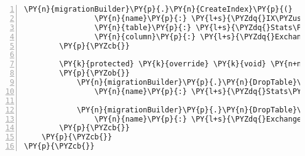 \begin{Verbatim}[commandchars=\\\{\},numbers=left,firstnumber=1,stepnumber=1,numberblanklines=0]
            \PY{n}{migrationBuilder}\PY{p}{.}\PY{n}{CreateIndex}\PY{p}{(}
                \PY{n}{name}\PY{p}{:} \PY{l+s}{\PYZdq{}IX\PYZus{}Stats\PYZus{}ExchangeId\PYZdq{}}\PY{p}{,}
                \PY{n}{table}\PY{p}{:} \PY{l+s}{\PYZdq{}Stats\PYZdq{}}\PY{p}{,}
                \PY{n}{column}\PY{p}{:} \PY{l+s}{\PYZdq{}ExchangeId\PYZdq{}}\PY{p}{)}\PY{p}{;}
        \PY{p}{\PYZcb{}}

        \PY{k}{protected} \PY{k}{override} \PY{k}{void} \PY{n+nf}{Down}\PY{p}{(}\PY{n}{MigrationBuilder} \PY{n}{migrationBuilder}\PY{p}{)}
        \PY{p}{\PYZob{}}
            \PY{n}{migrationBuilder}\PY{p}{.}\PY{n}{DropTable}\PY{p}{(}
                \PY{n}{name}\PY{p}{:} \PY{l+s}{\PYZdq{}Stats\PYZdq{}}\PY{p}{)}\PY{p}{;}

            \PY{n}{migrationBuilder}\PY{p}{.}\PY{n}{DropTable}\PY{p}{(}
                \PY{n}{name}\PY{p}{:} \PY{l+s}{\PYZdq{}Exchanges\PYZdq{}}\PY{p}{)}\PY{p}{;}
        \PY{p}{\PYZcb{}}
    \PY{p}{\PYZcb{}}
\PY{p}{\PYZcb{}}
\end{Verbatim}

